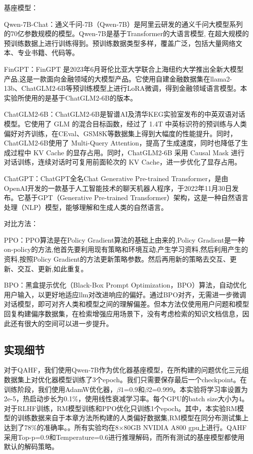 基座模型：

Qwen-7B-Chat\cite{qwen}：通义千问-7B（Qwen-7B）是阿里云研发的通义千问大模型系列的70亿参数规模的模型。Qwen-7B是基于Transformer的大语言模型, 在超大规模的预训练数据上进行训练得到。预训练数据类型多样，覆盖广泛，包括大量网络文本、专业书籍、代码等。

FinGPT\cite{yang2023fingpt}：FinGPT 是2023年6月哥伦比亚大学联合上海纽约大学推出全新大模型产品,这是一款面向金融领域的大模型产品。它使用自建金融数据集在llama2-13b、ChatGLM2-6B等预训练模型上进行LoRA微调，得到金融领域语言模型。本实验所使用的是基于ChatGLM2-6B的版本。

ChatGLM2-6B\cite{DBLP:conf/iclr/ZengLDWL0YXZXTM23}：ChatGLM2-6B是智谱AI及清华KEG实验室发布的中英双语对话模型。它使用了 GLM 的混合目标函数，经过了 1.4T 中英标识符的预训练与人类偏好对齐训练，在CEval、GSM8K等数据集上得到大幅度的性能提升。同时，ChatGLM2-6B使用了 Multi-Query Attention，提高了生成速度，同时也降低了生成过程中 KV Cache 的显存占用。同时，ChatGLM2-6B 采用 Causal Mask 进行对话训练，连续对话时可复用前面轮次的 KV Cache，进一步优化了显存占用。

ChatGP\cite{DBLP:conf/nips/Ouyang0JAWMZASR22}T：ChatGPT全名Chat Generative Pre-trained Transformer，是由OpenAI开发的一款基于人工智能技术的聊天机器人程序，于2022年11月30日发布。它基于GPT（Generative Pre-trained Transformer）架构，这是一种自然语言处理（NLP）模型，能够理解和生成人类的自然语言。

对比方法：

PPO\cite{DBLP:journals/corr/SchulmanWDRK17}：PPO算法是在Policy Gradient算法的基础上由来的,Policy Gradient是一种on-policy的方法,他首先要利用现有策略和环境互动,产生学习资料,然后利用产生的资料,按照Policy Gradient的方法更新策略参数。然后再用新的策略去交互、更新、交互、更新,如此重复。

BPO\cite{DBLP:journals/corr/abs-2311-04155}：黑盒提示优化（Black-Box Prompt Optimization，BPO）算法，自动优化用户输入，以更好地适应llm对改进响应的偏好。通过BPO对齐，无需进一步微调对话模型，即可对齐人类和模型之间的理解偏差。但本方法仅使用用户问题和模型回复构建偏序数据集，在检索增强应用场景下，没有考虑检索的知识文档信息，因此还有很大的空间可以进一步提升。

\subsection{实现细节}

对于QAHF，我们使用Qwen-7B作为优化器基座模型，在所构建的问题优化三元组数据集上对优化器模型训练了3个epoch。我们只需要保存最后一个checkpoint。在训练阶段，我们使用AdamW优化器，$\beta1$=0.9和$\beta2$=0.999。本实验将学习率设置为2e-5，热启动步长为0.1\%，使用线性衰减学习率。每个GPU的batch size大小为4。对于RLHF训练，RM模型训练和PPO优化只训练1个epoch。其中，本实验RM模型的训练数据来自于本章方法所构建的人类偏好数据集,RM模型在同分布测试集上达到了78\%的准确率。。所有实验均在8×80GB NVIDIA A800 gpu上进行。QAHF采用Top-p=0.9和Temperature=0.6进行推理解码，而所有测试的基座模型都使用默认的解码策略。

